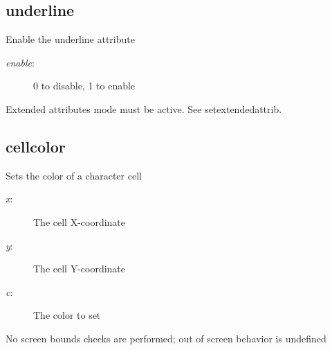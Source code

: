 \subsection{underline}
\begin{description}[leftmargin=2cm,style=nextline]
\item [Description:] {Enable the underline attribute}
\item [Syntax:] 
\item [Parameters:]
\begin{description}\item[]
\item [{\em enable}:] {0 to disable, 1 to enable}
\end{description}
\item [Notes:] {Extended attributes mode must be active. See setextendedattrib.}
\end{description}

\subsection{cellcolor}
\begin{description}[leftmargin=2cm,style=nextline]
\item [Description:] {Sets the color of a character cell}
\item [Syntax:] 
\item [Parameters:]
\begin{description}\item[]
\item [{\em x}:] {The cell X-coordinate}
\item [{\em y}:] {The cell Y-coordinate}
\item [{\em c}:] {The color to set}
\end{description}
\item [Notes:] {No screen bounds checks are performed; out of screen behavior is undefined }
\end{description}

